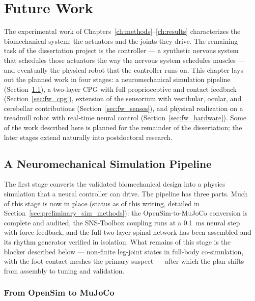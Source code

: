 \chapter{Future Work}\label{ch:futurework}
\graphicspath{{figs/50-futurework/}}

The experimental work of Chapters~\ref{ch:methods}--\ref{ch:results} characterizes the biomechanical system: the actuators and the joints they drive. The remaining task of the dissertation project is the controller --- a synthetic nervous system that schedules those actuators the way the nervous system schedules muscles --- and eventually the physical robot that the controller runs on. This chapter lays out the planned work in four stages: a neuromechanical simulation pipeline (Section~\ref{sec:fw_pipeline}), a two-layer CPG with full proprioceptive and contact feedback (Section~\ref{sec:fw_cpg}), extension of the sensorium with vestibular, ocular, and cerebellar contributions (Section~\ref{sec:fw_senses}), and physical realization on a treadmill robot with real-time neural control (Section~\ref{sec:fw_hardware}). Some of the work described here is planned for the remainder of the dissertation; the later stages extend naturally into postdoctoral research.

\section{A Neuromechanical Simulation Pipeline}\label{sec:fw_pipeline}

The first stage converts the validated biomechanical design into a physics simulation that a neural controller can drive. The pipeline has three parts. Much of this stage is now in place (status as of this writing, detailed in Section~\ref{sec:preliminary_sim_methods}): the OpenSim-to-MuJoCo conversion is complete and audited, the SNS-Toolbox coupling runs at a \qty{0.1}{\milli\second} neural step with force feedback, and the full two-layer spinal network has been assembled and its rhythm generator verified in isolation. What remains of this stage is the blocker described below --- non-finite leg-joint states in full-body co-simulation, with the foot-contact meshes the primary suspect --- after which the plan shifts from assembly to tuning and validation.

\subsection{From OpenSim to MuJoCo}


